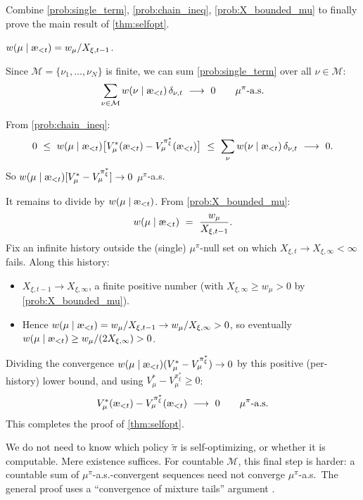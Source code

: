 \documentclass[fontsize=11pt, parskip=half]{scrartcl}
\newcommand{\cM}{\mathcal{M}}
\newcommand{\aes}{\textnormal{\ae}}
\begin{document}
\begin{exercise}
\label{prob:auto6}
Combine \cref{prob:single_term}, \cref{prob:chain_ineq}, \cref{prob:X_bounded_mu} to finally prove the
 main result of \cref{thm:selfopt}.


\begin{hint}
$w(\mu \mid \aes_{<t}) = w_\mu/X_{\xi,t-1}$.
\end{hint}
\end{exercise}

\begin{solution}
Since $\cM = \{\nu_1, \ldots, \nu_N\}$ is finite, we can sum \cref{prob:single_term} over all $\nu \in \cM$:
\[
    \sum_{\nu \in \cM} w(\nu \mid \aes_{<t})\, \delta_{\nu,t} ~\longrightarrow~ 0 \qquad \mu^\pi\text{-a.s.}
\]

From \cref{prob:chain_ineq}:
\[
    0 ~\leq~ w(\mu \mid \aes_{<t})\big[V_\mu^*(\aes_{<t}) - V_\mu^{\pi_\xi^*}(\aes_{<t})\big]
    ~\leq~ \sum_\nu w(\nu \mid \aes_{<t})\, \delta_{\nu,t}
    ~\longrightarrow~ 0.
\]
So $w(\mu \mid \aes_{<t})[V_\mu^* - V_\mu^{\pi_\xi^*}] \to 0$ $\mu^\pi$-a.s.

It remains to divide by $w(\mu \mid \aes_{<t})$. From \cref{prob:X_bounded_mu}:
\[
    w(\mu \mid \aes_{<t}) ~=~ \frac{w_\mu}{X_{\xi,t-1}}.
\]
Fix an infinite history outside the (single) $\mu^\pi$-null set on which $X_{\xi,t} \to X_{\xi,\infty} < \infty$ fails. Along this history:
\begin{itemize}\itemsep=2pt
    \item $X_{\xi,t-1} \to X_{\xi,\infty}$, a finite positive number (with $X_{\xi,\infty} \geq w_\mu > 0$ by \cref{prob:X_bounded_mu}).
    \item Hence $w(\mu \mid \aes_{<t}) = w_\mu / X_{\xi,t-1} \to w_\mu / X_{\xi,\infty} > 0$, so eventually $w(\mu \mid \aes_{<t}) \geq w_\mu / (2 X_{\xi,\infty}) > 0$.
\end{itemize}
Dividing the convergence $w(\mu \mid \aes_{<t}) (V_\mu^* - V_\mu^{\pi_\xi^*}) \to 0$ by this positive (per-history) lower bound, and using $V_\mu^* - V_\mu^{\pi_\xi^*} \geq 0$:
\[
    V_\mu^*(\aes_{<t}) - V_\mu^{\pi_\xi^*}(\aes_{<t}) ~\longrightarrow~ 0 \qquad \mu^\pi\text{-a.s.}
\]
This completes the proof of \cref{thm:selfopt}. \qedhere

\medskip
\end{solution}

\begin{remark}
We do not need to know which policy $\tilde\pi$ is self-optimizing, or whether it is computable. Mere existence suffices.
For countable $\cM$, this final step is harder: a countable sum of $\mu^\pi$-a.s.-convergent sequences need not converge $\mu^\pi$-a.s.\ The general proof uses a ``convergence of mixture tails'' argument \cite[Lem.~5.28]{Hutter:04uaibook}.
\end{remark}
\end{document}

